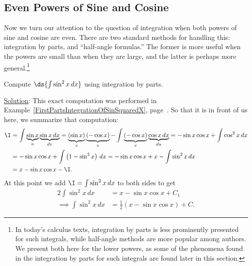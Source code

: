 \subsection{Even Powers of Sine and Cosine}
Now we turn our attention to the question of integration
when both powers of sine and cosine are even.  There
are two standard methods for handling this:
integration by parts, and ``half-angle formulas.''
The former is more useful when the powers are small
than when they are large, and the latter is perhaps
more general.\footnote{%
In today's calculus texts, integration by parts is less
prominently presented for such integrals, while half-angle
methods are more popular among authors.  We present
both here for the lower powers, as some of the phenomena 
found in the integration by parts 
for such integrals are found later in this section.%
}

\bex Compute $\ds{\int\sin^2x\,dx}$ using integration by parts.

\underline{Solution}: This exact computation was performed
in
Example~\ref{FirstPartsIntegrationOfSinSquaredX},
page~\pageref{FirstPartsIntegrationOfSinSquaredX}.
So that it is in front of us here, we summarize that 
computation:
\begin{align*}
\I&=\int\underbrace{\sin x}_{u}\underbrace{\sin x\,dx}_{dv}
   =\underbrace{(\sin x)}_v\underbrace{(-\cos x)}_{v}
         -\int\underbrace{(-\cos x)}_v\underbrace{\cos x\,dx}_{du}
   =-\sin x\cos x+\int\cos^2x\,dx\\
  &=-\sin x\cos x+\int\left(1-\sin^2x\right)\,dx
   =-\sin x\cos x+x-\int\sin^2x\,dx\\
  &=x-\sin x\cos x-\I.
\end{align*}
At this point we add $\I=\int\sin^2x\,dx$ to both sides to get
\begin{align*}
2\int\sin^2x\,dx&=x-\sin x\cos x+C_1\\
\implies
\int\sin^2x\,dx&=\frac12\left(x-\sin x\cos x\right)+C.\end{align*}
\label{IntOfSineSquaredForTrigIntegrals}\eex

